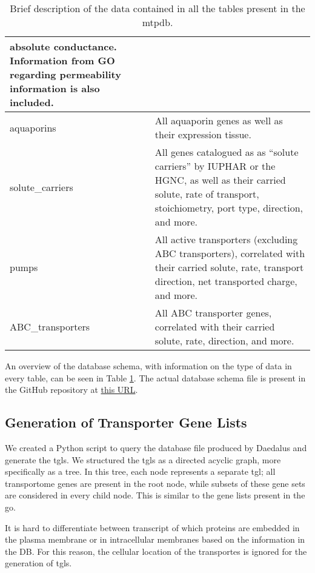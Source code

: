 \begin{table}
\begin{tabularx}{\textwidth}{|l|X|}
        absolute conductance. Information from GO regarding permeability information is also included. \\
        \hline
    aquaporins
        & All aquaporin genes as well as their expression tissue. \\
        \hline
    solute\_carriers
        & All genes catalogued as as ``solute carriers'' by IUPHAR or the HGNC,
        as well as their carried solute, rate of transport, stoichiometry, port
        type, direction, and more. \\
        \hline
    pumps
        & All active transporters (excluding ABC transporters), correlated with their carried solute, rate,
        transport direction, net transported charge, and more. \\
        \hline
    ABC\_transporters
        & All ABC transporter genes, correlated with their carried solute, rate,
        direction, and more. \\
        \hline
\end{tabularx}
\caption{Brief description of the data contained in all the tables present in
    the \gls{mtpdb}.}
\label{tab:databaseSchema}
\end{table}

An overview of the database schema, with information on the type of data in every table, can be seen in Table \ref{tab:databaseSchema}.
The actual database schema file is present in the GitHub repository at
\href{https://github.com/CMA-Lab/MTP-DB/blob/main/src/db_rebuilder/daedalus/local_data/schema.sql}{this URL}.

\subsection{Generation of Transporter Gene Lists}

We created a Python script to query the database file produced by Daedalus and generate the \glspl{tgl}.
We structured the \glspl{tgl} as a directed acyclic graph, more specifically as a tree.
In this tree, each node represents a separate \gls{tgl}; all transportome genes are present in the root node, while subsets of these gene sets are considered in every child node.
This is similar to the gene lists present in the \gls{go}.

It is hard to differentiate between transcript of which proteins are embedded in the plasma membrane or in intracellular membranes based on the information in the DB.
For this reason, the cellular location of the transportes is ignored for the generation of \glspl{tgl}.

